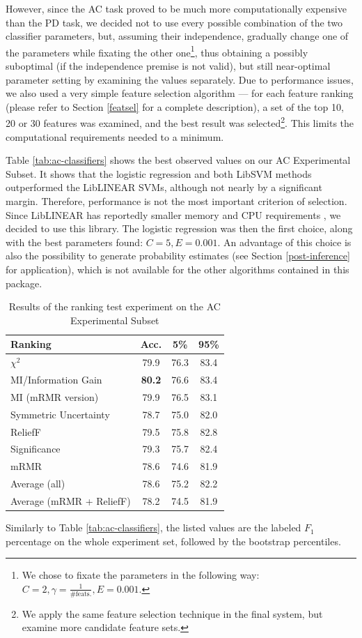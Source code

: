 \documentclass[12pt,notitlepage]{report}
\begin{document}
However, since the AC task proved to be much more computationally expensive than the PD task, we decided not to use every possible combination of the two classifier parameters, but, assuming their independence, gradually change one of the parameters while fixating the other one\footnote{We chose to fixate the parameters in the following way: $C = 2, \gamma = \frac{1}{\mbox{\#feats.}}, E = 0.001$.}, thus obtaining a possibly suboptimal (if the independence premise is not valid), but still near-optimal parameter setting by examining the values separately. Due to performance issues, we also used a very simple feature selection algorithm --- for each feature ranking (please refer to Section \ref{featsel} for a complete description), a set of the top 10, 20 or 30 features was examined, and the best result was selected\footnote{We apply the same feature selection technique in the final system, but examine more candidate feature sets.}. This limits the computational requirements needed to a minimum.

Table \ref{tab:ac-classifiers} shows the best observed values on our AC Experimental Subset. It shows that the logistic regression and both LibSVM methods outperformed the LibLINEAR SVMs, although not nearly by a significant margin. Therefore, performance is not the most important criterion of selection. Since LibLINEAR has reportedly smaller memory and CPU requirements \citep[our experiments were not designed to measure this, cf.][]{fan08}, we decided to use this library. The logistic regression was then the first choice, along with the best parameters found: $C = 5, E = 0.001$. An advantage of this choice is also the possibility to generate probability estimates (see Section \ref{post-inference} for application), which is not available for the other algorithms contained in this package.

\begin{table}[htb]
\caption{Results of the ranking test experiment on the AC Experimental Subset}\label{tab:ranker-pc}\footnotesize
\begin{center}
\begin{tabular}{|l|c|c|c|}\hline
\bf Ranking & \bf Acc. & \bf 5\% & \bf 95\% \\\hline
$\chi^2$ & 79.9 & 76.3 & 83.4 \\
MI/Information Gain & \bf 80.2 & 76.6 & 83.4 \\
MI (mRMR version) & 79.9 & 76.5 & 83.1 \\
Symmetric Uncertainty & 78.7 & 75.0 & 82.0 \\
ReliefF & 79.5 & 75.8 & 82.8 \\
Significance & 79.3 & 75.7 & 82.4 \\
mRMR & 78.6 & 74.6 & 81.9 \\
Average (all) & 78.6 & 75.2 & 82.2 \\
Average (mRMR + ReliefF) & 78.2 & 74.5 & 81.9 \\\hline
\end{tabular}
\end{center}
Similarly to Table \ref{tab:ac-classifiers}, the listed values are the labeled $F_1$ percentage on the whole experiment set, followed by the bootstrap percentiles.
\end{table}
\end{document}
